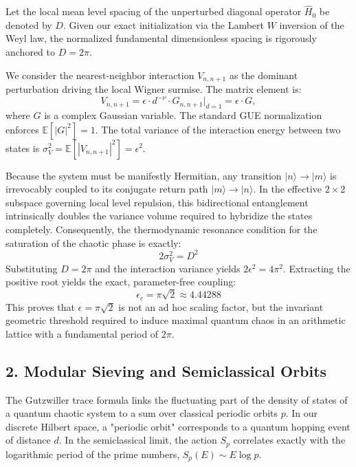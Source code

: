 \documentclass[aps,prl,preprint,superscriptaddress,floatfix]{revtex4-2}
\begin{document}
Let the local mean level spacing of the unperturbed diagonal operator $\hat{H}_0$ be denoted by $D$. Given our exact initialization via the Lambert $W$ inversion of the Weyl law, the normalized fundamental dimensionless spacing is rigorously anchored to $D = 2\pi$.

We consider the nearest-neighbor interaction $V_{n, n+1}$ as the dominant perturbation driving the local Wigner surmise. The matrix element is:
\begin{equation}
V_{n, n+1} = \epsilon \cdot d^{-\nu} \cdot G_{n, n+1} \bigg|_{d=1} = \epsilon \cdot G,
\end{equation}
where $G$ is a complex Gaussian variable. The standard GUE normalization enforces $\mathbb{E}[|G|^2] = 1$. The total variance of the interaction energy between two states is $\sigma_V^2 = \mathbb{E}[|V_{n, n+1}|^2] = \epsilon^2$.

Because the system must be manifestly Hermitian, any transition $|n\rangle \to |m\rangle$ is irrevocably coupled to its conjugate return path $|m\rangle \to |n\rangle$. In the effective $2 \times 2$ subspace governing local level repulsion, this bidirectional entanglement intrinsically doubles the variance volume required to hybridize the states completely. Consequently, the thermodynamic resonance condition for the saturation of the chaotic phase is exactly:
\begin{equation}
2 \sigma_V^2 = D^2
\end{equation}
Substituting $D = 2\pi$ and the interaction variance yields $2 \epsilon^2 = 4\pi^2$. Extracting the positive root yields the exact, parameter-free coupling:
\begin{equation}
\epsilon_c = \pi\sqrt{2} \approx 4.44288
\end{equation}
This proves that $\epsilon = \pi\sqrt{2}$ is not an ad hoc scaling factor, but the invariant geometric threshold required to induce maximal quantum chaos in an arithmetic lattice with a fundamental period of $2\pi$.

\subsection{2. Modular Sieving and Semiclassical Orbits}
The Gutzwiller trace formula links the fluctuating part of the density of states of a quantum chaotic system to a sum over classical periodic orbits $p$. In our discrete Hilbert space, a "periodic orbit" corresponds to a quantum hopping event of distance $d$. In the semiclassical limit, the action $S_p$ correlates exactly with the logarithmic period of the prime numbers, $S_p(E) \sim E \log p$.
\end{document}
